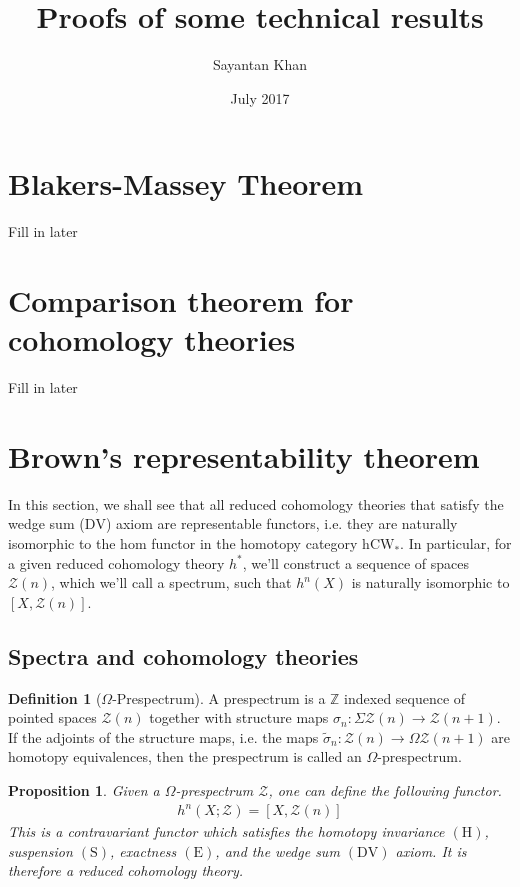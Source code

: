 \documentclass[12pt, notitlepage]{article}
\title{Proofs of some technical results}
\author{Sayantan Khan}
\date{July 2017}
\newtheorem{prop}[thm]{Proposition}
\theoremstyle{definition}
\newtheorem{defn}{Definition}[section]
\newcommand{\cat}[1]{\mathrm{#1}}
\newcommand{\cohomtheorie}{{h}^{\ast}}
\newcommand{\calz}{\mathcal{Z}}
\begin{document}
\maketitle

\tableofcontents

\newpage

\section{Blakers-Massey Theorem}
\label{sec:blak-mass-theor}

Fill in later

\section{Comparison theorem for cohomology theories}
\label{sec:comp-theor-cohom}

Fill in later

\section{Brown's representability theorem}
\label{sec:browns-repr-theor}

In this section, we shall see that all reduced cohomology theories that satisfy the wedge sum
($\mathrm{DV}$) axiom are representable functors, i.e. they are naturally isomorphic to the hom
functor in the homotopy category $\cat{hCW}_{\ast}$. In particular, for a given reduced cohomology
theory $\cohomtheorie$, we'll construct a sequence of spaces $\calz(n)$, which we'll call a
spectrum, such that $h^n(X)$ is naturally isomorphic to $\left[X, \calz(n)\right]$.

\subsection{Spectra and cohomology theories}
\label{sec:spectra-cohom-theor}

\begin{defn}[$\Omega$-Prespectrum]
  A prespectrum is a $\mathbb{Z}$ indexed sequence of pointed spaces $\calz(n)$ together with
  structure maps $\sigma_n: \Sigma \calz(n) \to \calz(n+1)$. If the adjoints of the structure maps,
  i.e. the maps $\widetilde{\sigma}_n: \calz(n) \to \Omega \calz(n+1)$ are homotopy equivalences,
  then the prespectrum is called an $\Omega$-prespectrum.
\end{defn}

\begin{prop}
  Given a $\Omega$-prespectrum $\calz$, one can define the following functor.
  \begin{align*}
    h^n(X; \calz) = \left[X, \calz(n)\right]
  \end{align*}
  This is a contravariant functor which satisfies the homotopy invariance $(\mathrm{H})$, suspension
  $(\mathrm{S})$, exactness $(\mathrm{E})$, and the wedge sum $(\mathrm{DV})$ axiom. It is therefore
  a reduced cohomology theory.
\end{prop}
\end{document}
